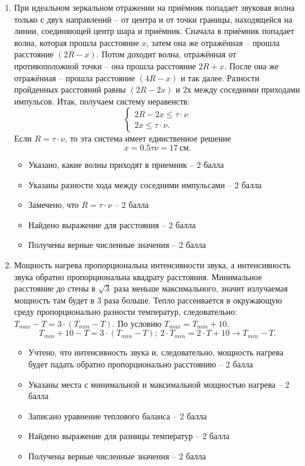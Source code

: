 \begin{enumerate}
    \item При идеальном зеркальном отражении на приёмник попадает звуковая волна только с двух направлений – от центра и от точки границы, находящейся на линии, соединяющей центр шара и приёмник. Сначала в приёмник попадает волна, которая прошла расстояние $x$, затем она же отражённая – прошла расстояние $(2R-x)$. Потом доходит волна, отражённая от противоположной точки – она прошла расстояние $2R+x$. После она же отражённая – прошла расстояние $(4R-x)$ и так далее. Разности пройденных расстояний равны $(2R-2x)$ и $2х$ между соседними приходами импульсов. Итак, получаем систему неравенств: 
    $$ \left\{
        \begin{aligned}
            2R-2x \leq \tau \cdot \nu \\
            2x \leq \tau \cdot \nu.
        \end{aligned}
        \right.$$  
    Если $R= \tau \cdot \nu$, то эта система имеет единственное решение $$x = 0.5 \tau \nu  = 17 \: \text{см}.$$
    

    \markSection
    
    \begin{itemize}
	    \item Указано, какие волны приходят в приемник – 2 балла
	    \item Указаны разности хода между соседними импульсами – 2 балла
	    \item Замечено, что $R= \tau \cdot \nu$  – 2 балла
	    \item Найдено выражение для расстояния  – 2 балла
	    \item Получены верные численные значения – 2 балла
    \end{itemize}

    \item Мощность нагрева пропорциональна интенсивности звука, а интенсивность звука обратно пропорциональна квадрату расстояния. Минимальное расстояние до стены в $\sqrt{3}$ раза меньше максимального, значит излучаемая мощность там будет в 3 раза больше. Тепло рассеивается в окружающую среду пропорционально разности температур, следовательно:  $T_{max}-T=3\cdot (T_{min}-T)$. По условию $T_{max}=T_{min}+10$. $$T_{min}+10-T=3\cdot (T_{min}-T); \: 2\cdot T_{min}=2\cdot T+10\rightarrow T_{min} - T.$$
    

    \markSection

    \begin{itemize}
	    \item Учтено, что интенсивность звука и, следовательно, мощность нагрева будет падать обратно пропорционально расстоянию – 2 балла
	    \item Указаны места с минимальной и максимальной мощностью нагрева – 2 балла
	    \item Записано уравнение теплового баланса – 2 балла
	    \item Найдено выражение для разницы температур  – 2 балла
	    \item Получены верные численные значения – 2 балла
    \end{itemize}


\end{enumerate}
